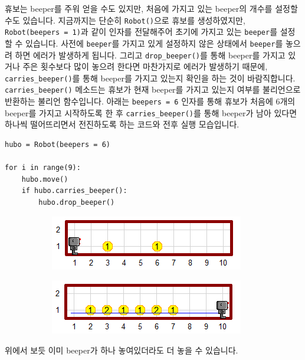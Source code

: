 \documentclass[../main.tex]{subfiles}
\begin{document}
휴보는 beeper를 주워 얻을 수도 있지만, 처음에 가지고 있는 beeper의 개수를 설정할 수도 있습니다.
지금까지는 단순히 \texttt{Robot()}으로 휴보를 생성하였지만, \texttt{Robot(beepers = 1)}과 같이 인자를 전달해주어 초기에 가지고 있는 \texttt{beeper}를 설정할 수 있습니다.
사전에 \texttt{beeper}를 가지고 있게 설정하지 않은 상태에서 \texttt{beeper}를 놓으려 하면 에러가 발생하게 됩니다.
그리고 \texttt{drop\_beeper()}를 통해 beeper를 가지고 있거나 주은 횟수보다 많이 놓으려 한다면 마찬가지로 에러가 발생하기 때문에, \texttt{carries\_beeper()}를 통해 beeper를 가지고 있는지 확인을 하는 것이 바람직합니다.
\texttt{carries\_beeper()} 메소드는 휴보가 현재 beeper를 가지고 있는지 여부를 불리언으로 반환하는 불리언 함수입니다.
아래는 \texttt{beepers = 6} 인자를 통해 휴보가 처음에 6개의 beeper를 가지고 시작하도록 한 후 \texttt{carries\_beeper()}를 통해 beeper가 남아 있다면 하나씩 떨어뜨리면서 전진하도록 하는 코드와 전후 실행 모습입니다.
\begin{verbatim}
hubo = Robot(beepers = 6)

for i in range(9):
    hubo.move()
    if hubo.carries_beeper():
        hubo.drop_beeper()
\end{verbatim}
\begin{figure}[H]
\centering
\begin{subfigure}{.5\textwidth}
\centering
\includegraphics[width=.9\linewidth]{"./lectures/lecture5_pickbeeperbef"}
\label{fig:lecture5putbeeperbef}
\end{subfigure}%
\begin{subfigure}{.5\textwidth}
\centering
\includegraphics[width=.9\linewidth]{"./lectures/lecture5_putbeeperaft"}
\label{fig:lecture5putbeeperaft}
\end{subfigure}
\end{figure}
위에서 보듯 이미 beeper가 하나 놓여있더라도 더 놓을 수 있습니다.
\end{document}
